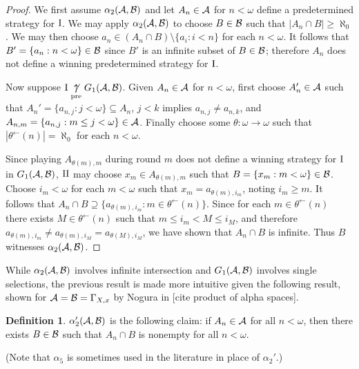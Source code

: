 \documentclass{amsart}
\theoremstyle{plain}
\theoremstyle{definition}
\newtheorem{definition}[theorem]{Definition}
\theoremstyle{remark}
\theoremstyle{plain}
\theoremstyle{definition}
\theoremstyle{remark}
\begin{document}
\begin{proof}
We first assume \(\alpha_2(\mathcal{A},\mathcal{B})\) and let \(A_n\in\mathcal{A}\) for \(n<\omega\)
define a predetermined strategy for \(\mathrm{I}\).
We may apply \(\alpha_2(\mathcal{A},\mathcal{B})\) to choose \(B\in\mathcal{B}\) such that
\(|A_n\cap B|\geq\aleph_0\). We may then choose \(a_n\in(A_n\cap B)\setminus\{a_i:i<n\}\)
for each \(n<\omega\). It follows that \(B'=\{a_n:n<\omega\}\in\mathcal{B}\) since
\(B'\) is an infinite subset of \(B\in\mathcal{B}\); therefore \(A_n\) does not define
a winning predetermined strategy for \(\mathrm{I}\).

Now suppose \(\mathrm{I}\underset{\text{pre}}{\not\uparrow} G_1(\mathcal{A},\mathcal{B})\). Given \(A_n\in\mathcal{A}\) for \(n<\omega\),
first choose \(A_n'\in\mathcal{A}\) such that \(A_n'=\{a_{n,j}:j<\omega\}\subseteq A_n\),
\(j<k\) implies \(a_{n,j}\not=a_{n,k}\),
and \(A_{n,m}=\{a_{n,j}:m\leq j<\omega\}\in\mathcal{A}\).
Finally choose
some \(\theta:\omega\to\omega\) such that \(|\theta^{\leftarrow}(n)|=\aleph_0\) for
each \(n<\omega\).

Since playing \(A_{\theta(m),m}\) during round \(m\)
does not define a winning strategy for \(\mathrm{I}\) in
\(G_1(\mathcal{A},\mathcal{B})\), \(\mathrm{II}\) may choose \(x_m\in A_{\theta(m),m}\)
such that \(B=\{x_m:m<\omega\}\in\mathcal{B}\).
Choose \(i_m<\omega\) for each \(m<\omega\) such that
\(x_m=a_{\theta(m),i_m}\), noting \(i_m\geq m\).
It follows that 
\(A_n\cap B\supseteq\{a_{\theta(m),i_m}:m\in\theta^{\leftarrow}(n)\}\).
Since for each \(m\in\theta^{\leftarrow}(n)\) there exists
\(M\in\theta^{\leftarrow}(n)\) such that \(m\leq i_m<M\leq i_{M}\),
and therefore \(a_{\theta(m),i_m}\not=a_{\theta(m),i_{M}}=a_{\theta(M),i_{M}}\),
we have shown that \(A_n\cap B\) is infinite. Thus \(B\) witnesses
\(\alpha_2(\mathcal{A},\mathcal{B})\).
\end{proof}

While \(\alpha_2(\mathcal{A},\mathcal{B})\) involves infinite intersection and
\(G_1(\mathcal{A},\mathcal{B})\) involves single selections, the previous result is made
more intuitive given the following result, shown for \(\mathcal{A}=\mathcal{B}=\Gamma_{X,x}\)
by Nogura in [cite product of alpha spaces].

\begin{definition}
\(\alpha_2'(\mathcal{A},\mathcal{B})\) is the following claim:
if \(A_n\in\mathcal{A}\) for all \(n<\omega\), then there exists \(B\in\mathcal{B}\) such that
\(A_n\cap B\) is nonempty for all \(n<\omega\).
\end{definition}

(Note that \(\alpha_5\) is sometimes used in the literature in place of \(\alpha_2'\).)
\end{document}
